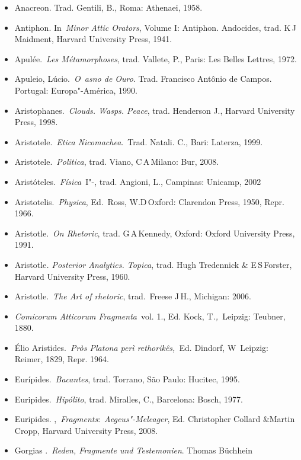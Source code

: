 {\begin{itemize}
\itemsep1pt\parskip0pt
\item
  Anacreon. Trad. Gentili, B., Roma: Athenaei, 1958.
\item
  Antiphon. In~\emph{Minor Attic Orators}, Volume I: Antiphon.
  Andocides, trad. K\,J\,Maidment, Harvard University Press, 1941.
\item
  Apulée.~\emph{Les Métamorphoses}, trad. Vallete, P., Paris: Les Belles
  Lettres, 1972.
\item
  Apuleio, Lúcio.~\emph{O~asno de Ouro}. Trad. Francisco Antônio de
  Campos. Portugal: Europa"-América, 1990.
\item
  Aristophanes.~\emph{Clouds. Wasps. Peace}, trad. Henderson J., Harvard
  University Press, 1998.
\item
  Aristotele.~\emph{Etica Nicomachea}.~Trad. Natali. C., Bari: Laterza,
  1999.
\item
  Aristotele.~\emph{Politica}, trad. Viano, C\,A\,Milano: Bur, 2008.
\item
  Aristóteles.~\emph{Física}~I"-, trad. Angioni, L., Campinas: Unicamp,
  2002
\item
  Aristotelis.~\emph{Physica}, Ed.~Ross, W.D\,Oxford: Clarendon Press,
  1950, Repr. 1966.
\item
  Aristotle.~\emph{On Rhetoric}, trad. G\,A\,Kennedy, Oxford: Oxford
  University Press, 1991.
\item
  Aristotle\emph{. Posterior Analytics. Topica}, trad. Hugh Tredennick
  \& E\,S\,Forster, Harvard University Press, 1960.
\item
  Aristotle.~\emph{The Art of rhetoric}, trad.~Freese J\,H., Michigan:
  2006.
\item
  \emph{Comicorum Atticorum Fragmenta}~vol. 1., Ed. Kock,
  T\emph{.,~}Leipzig: Teubner, 1880.
\item
  Élio Aristides.~\emph{Pròs Platona perì rethorikês,~}Ed. Dindorf, W\,  Leipzig: Reimer, 1829, Repr. 1964.
\item
  Eurípides.~\emph{Bacantes}, trad.  Torrano, São Paulo: Hucitec,
  1995.
\item
  Euripides.~\emph{Hipólito}, trad. Miralles, C., Barcelona: Bosch,
  1977.
\item
  Euripides. ,~\emph{Fragments}:~\emph{Aegeus"-Meleager}, Ed.
  Christopher Collard \&Martin Cropp, Harvard University Press, 2008.
\item
  Gorgias .~\emph{Reden, Fragmente und Testemonien}. Thomas Büchhein

\end{itemize}}
